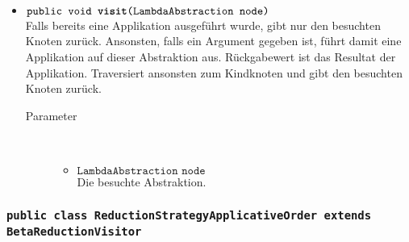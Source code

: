 \begin{description}
\begin{itemize}
		\item $\texttt{public void \textbf{visit}(LambdaAbstraction node)}$ \\ Falls bereits eine Applikation ausgeführt wurde, gibt nur den besuchten Knoten zurück. Ansonsten, falls ein Argument gegeben ist, führt damit eine Applikation auf dieser Abstraktion aus. Rückgabewert ist das Resultat der Applikation. Traversiert ansonsten zum Kindknoten und gibt den besuchten Knoten zurück.
		\begin{description}
			\item[Parameter] \hfill \\
			\vspace{-.8cm}
			\begin{itemize}
				\item $\texttt{LambdaAbstraction node}$ \\ Die besuchte Abstraktion.
			\end{itemize}
		\end{description}
	\end{itemize}
\end{description}

\subsubsection{\normalfont \texttt{public class \textbf{ReductionStrategyApplicativeOrder} extends BetaReductionVisitor}}

